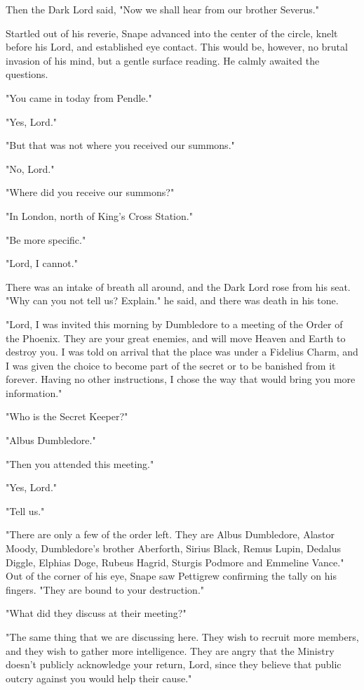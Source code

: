 Then the Dark Lord said, "Now we shall hear from our brother Severus."

Startled out of his reverie, Snape advanced into the center of the circle, knelt before his Lord, and established eye contact. This would be, however, no brutal invasion of his mind, but a gentle surface reading. He calmly awaited the questions.

"You came in today from Pendle."

"Yes, Lord."

"But that was not where you received our summons."

"No, Lord."

"Where did you receive our summons?"

"In London, north of King's Cross Station."

"Be more specific."

"Lord, I cannot."

There was an intake of breath all around, and the Dark Lord rose from his seat. "Why can you not tell us? Explain." he said, and there was death in his tone.

"Lord, I was invited this morning by Dumbledore to a meeting of the Order of the Phoenix. They are your great enemies, and will move Heaven and Earth to destroy you. I was told on arrival that the place was under a Fidelius Charm, and I was given the choice to become part of the secret or to be banished from it forever. Having no other instructions, I chose the way that would bring you more information."

"Who is the Secret Keeper?"

"Albus Dumbledore."

"Then you attended this meeting."

"Yes, Lord."

"Tell us."

"There are only a few of the order left. They are Albus Dumbledore, Alastor Moody, Dumbledore's brother Aberforth, Sirius Black, Remus Lupin, Dedalus Diggle, Elphias Doge, Rubeus Hagrid, Sturgis Podmore and Emmeline Vance." Out of the corner of his eye, Snape saw Pettigrew confirming the tally on his fingers. "They are bound to your destruction."

"What did they discuss at their meeting?"

"The same thing that we are discussing here. They wish to recruit more members, and they wish to gather more intelligence. They are angry that the Ministry doesn't publicly acknowledge your return, Lord, since they believe that public outcry against you would help their cause."

